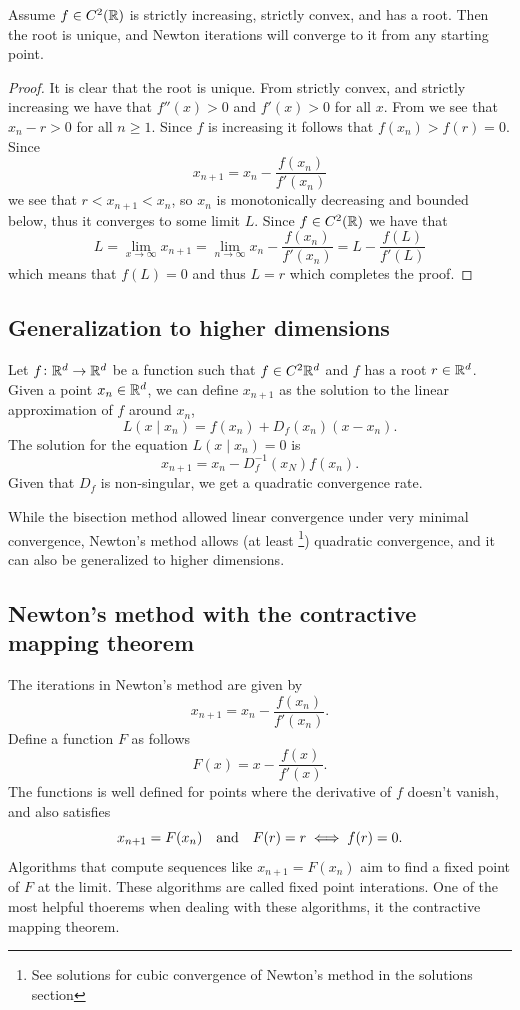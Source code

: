 \documentclass[11pt,a4paper]{article}
\begin{document}
\begin{theorem}
  Assume $f \in C^2(\mathbb{R})$ is strictly increasing, strictly convex, 
  and has a root.
  Then the root is unique, and Newton iterations will converge to it from
  any starting point.
\end{theorem}
\begin{proof}
  It is clear that the root is unique.
  From strictly convex, and strictly increasing we have that
  $f''(x) > 0$ and $f'(x) > 0$ for all $x$.
  From  we see that $x_n - r > 0$ for all $n \geq 1$.
  Since $f$ is increasing it follows that $f(x_n) > f(r) = 0$.
  Since
  \[
    x_{n + 1} = x_n - \frac{f(x_n)}{f'(x_n)}
  \]
  we see that $r < x_{n + 1} < x_n$, so $x_n$ is monotonically decreasing and
  bounded below, thus it converges to some limit $L$.
  Since $f \in C^2(\mathbb{R})$ we have that
  \[
    L = 
    \lim_{x \to \infty} x_{n + 1} =
    \lim_{n \to \infty} x_n - \frac{f(x_n)}{f'(x_n)} =
    L - \frac{f(L)}{f'(L)}
  \]
  which means that $f(L) = 0$ and thus $L = r$ which completes the proof.
\end{proof}

\subsection{Generalization to higher dimensions}
Let $f \colon \mathbb{R}^d \to \mathbb{R}^d$ be a function such that $f \in C^2{\mathbb{R}^d}$
and $f$ has a root $r \in \mathbb{R}^d$.
Given a point $x_n \in \mathbb{R}^d$, we can define $x_{n + 1}$ as the solution
to the linear approximation of $f$ around $x_n$,
\[
  L(x \mid x_n) = f(x_n) + D_f(x_n)(x - x_n).
\]
The solution for the equation $L(x \mid x_n) = 0$ is
\[
  x_{n + 1} = x_n- D_f^{-1}(x_N) f(x_n).
\]
Given that $D_f$ is non-singular, we get a quadratic convergence rate.

\begin{remark}
  While the bisection method allowed linear convergence under very minimal
  convergence, Newton's method allows
  (at least \footnote{See solutions for cubic convergence of Newton's method
  in the solutions section}) quadratic convergence,
  and it can also be generalized to higher dimensions.
\end{remark}

\subsection{Newton's method with the contractive mapping theorem}
The iterations in Newton's method are given by
\[
  x_{n+1} = x_n - \frac{f(x_n)}{f'(x_n)}.
\]
Define a function $F$ as follows
\[
  F(x) = x - \frac{f(x)}{f'(x)}.
\]
The functions is well defined for points where the derivative of $f$ doesn't
vanish, and also satisfies
\[
  x_{n+1} = F(x_n) \quad \text{and} \quad F(r) = r \iff f(r) = 0.
\]
Algorithms that compute sequences like $x_{n+1} = F(x_n)$ aim to find a fixed
point of $F$ at the limit.
These algorithms are called fixed point interations.
One of the most helpful thoerems when dealing with these algorithms,
it the contractive mapping theorem.
\end{document}
